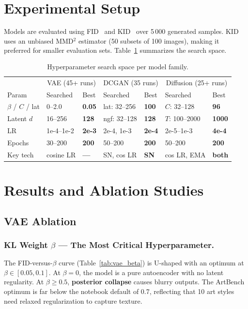 \documentclass[runningheads]{llncs}
\begin{document}
\section{Experimental Setup}\label{sec:setup}

Models are evaluated using FID~\cite{heusel2017} and KID~\cite{binkowski2018} over 5\,000 generated samples. KID uses an unbiased MMD$^2$ estimator (50 subsets of 100 images), making it preferred for smaller evaluation sets. Table~\ref{tab:search_all} summarizes the search space.

\begin{table}[htbp]
\caption{Hyperparameter search space per model family.}\label{tab:search_all}
\centering\small
\begin{tabular}{l|ll|ll|ll}
\toprule
& \multicolumn{2}{c|}{VAE (45+ runs)} & \multicolumn{2}{c|}{DCGAN (35 runs)} & \multicolumn{2}{c}{Diffusion (25+ runs)} \\
Param & Searched & Best & Searched & Best & Searched & Best \\
\midrule
$\beta$ / $C$ / lat & 0--2.0 & \textbf{0.05} & lat: 32--256 & \textbf{100} & $C$: 32--128 & \textbf{96} \\
Latent $d$ & 16--256 & \textbf{128} & ngf: 32--128 & \textbf{128} & $T$: 100--2000 & \textbf{1000} \\
LR & 1e-4--1e-2 & \textbf{2e-3} & 2e-4, 1e-3 & \textbf{2e-4} & 2e-5--1e-3 & \textbf{4e-4} \\
Epochs & 30--200 & \textbf{200} & 50--200 & \textbf{200} & 50--200 & \textbf{200} \\
Key tech & cosine LR & \textbf{---} & SN, cos LR & \textbf{SN} & cos LR, EMA & \textbf{both} \\
\bottomrule
\end{tabular}
\end{table}

\section{Results and Ablation Studies}\label{sec:results}

\subsection{VAE Ablation}\label{sec:vae_ablation}

\subsubsection{KL Weight $\beta$ --- The Most Critical Hyperparameter.}
The FID-versus-$\beta$ curve (Table~\ref{tab:vae_beta}) is U-shaped with an optimum at $\beta \in [0.05, 0.1]$. At $\beta=0$, the model is a pure autoencoder with no latent regularity. At $\beta \geq 0.5$, \textbf{posterior collapse} causes blurry outputs. The ArtBench optimum is far below the notebook default of 0.7, reflecting that 10 art styles need relaxed regularization to capture texture.
\end{document}
